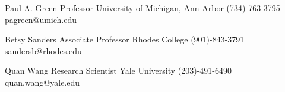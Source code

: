 \documentclass[11pt,letterpaper,roman]{moderncv} %
\begin{document}
\cventry{}
{Paul A. Green}
{\newline{}Professor}
{\newline{}University of Michigan, Ann Arbor}{}
{
(734)-763-3795
\newline{}pagreen@umich.edu
\newline{}
}


\cventry{}
{Betsy Sanders}
{\newline{}Associate Professor}
{\newline{}Rhodes College}{}
{
(901)-843-3791
\newline{}sandersb@rhodes.edu
\newline{}
}

\cventry{}
{Quan Wang}
{\newline{}Research Scientist}
{\newline{}Yale University}{}
{
(203)-491-6490
\newline{}quan.wang@yale.edu
\newline{}
}




\end{document}
